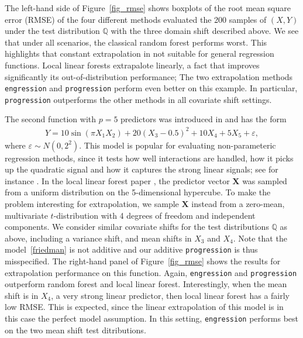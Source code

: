 \documentclass{statsoc}
\theoremstyle{break}
\newcommand{\Pte}{\mathbb Q}
\begin{document}
The left-hand side of Figure~\ref{fig_rmse} shows boxplots of the root mean square error (RMSE) of the four different methods evaluated the 200 samples of $(X,Y)$ under the test distribution $\Pte$ with the three domain shift described above.  
We see that under all scenarios, the classical random forest performs worst. This highlights that constant extrapolation in not suitable for general regression functions. Local linear forests extrapalote linearly, a fact that improves significantly its out-of-distribution performance; The two extrapolation methods \texttt{engression} and \texttt{progression} perform even better on this example. In particular, \texttt{progression} outperforms the other methods in all covariate shift settings. 

The second function with $p=5$ predictors was introduced in \cite{fri1991} and has the form
\begin{align}\label{friedman}
	Y = 10\sin(\pi X_1 X_2) + 20 (X_3 - 0.5)^2 + 10X_4 + 5X_5 + \varepsilon,
\end{align}
where $\varepsilon \sim N(0, 2^2)$. This model is popular for evaluating non-parameteric regression methods, since it tests how well interactions are handled, how it picks up the quadratic signal and how it captures the strong linear signals; see for instance \cite{chi2010}. In the local linear forest
paper \cite{friedberg:tibshirani:wager:2021}, the predictor vector $\mathbf X$ was sampled from a uniform distribution on the 5-dimensional hypercube. To make the problem interesting for extrapolation, we sample $\mathbf X$ instead from a zero-mean, multivariate $t$-distribution with 4 degrees of freedom and independent components. We consider similar covariate shifts for the test distributions $\Pte$ as above, including a variance shift, and mean shifts in $X_3$ and $X_4$.
Note that the model~\eqref{friedman} is not additive and our additive \texttt{progression} is thus misspecified. The right-hand panel of Figure~\ref{fig_rmse} shows the results for extrapolation performance on this function. Again, \texttt{engression} and \texttt{progression} outperform random forest and local linear forest. Interestingly, when the mean shift is in $X_4$, a very strong linear predictor, then local linear forest has a fairly low RMSE. This is expected, since the linear extrapolation of this model is in this case the perfect model assumption. In this setting, \texttt{engression} performs best on the two mean shift test ditributions.
\end{document}
